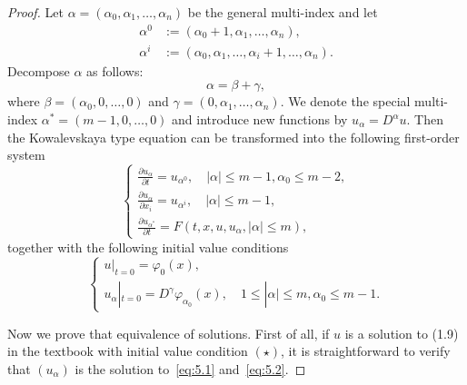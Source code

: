 \begin{proof}
  Let $\alpha = (\alpha_0,\alpha_1,\ldots,\alpha_n)$ be the general multi-index
  and let 
  \begin{align*}
    \alpha^0 & := (\alpha_0+1,\alpha_1,\ldots,\alpha_n), \\
    \alpha^i & := (\alpha_0,\alpha_1,\ldots,\alpha_i+1,\ldots,\alpha_n).
  \end{align*}
  Decompose $\alpha$ as follows:
  \[ \alpha = \beta + \gamma, \]
  where $\beta=(\alpha_0,0,\ldots,0)$ and $\gamma=(0,\alpha_1,\ldots,\alpha_n)$.
  We denote the special multi-index $\alpha^* = (m-1,0,\ldots,0)$
  and introduce new functions by $u_\alpha = D^\alpha u$.
  Then the Kowalevskaya type equation can be transformed into
  the following first-order system
  \begin{equation}\label{eq:5.1}
    \begin{cases}
      \frac{\partial u_\alpha}{\partial t} = u_{\alpha^0}, \quad |\alpha|\leq m-1, \alpha_0\leq m-2, \\
      \frac{\partial u_\alpha}{\partial x_i} = u_{\alpha^i}, \quad |\alpha|\leq m-1, \\
      \frac{\partial u_{\alpha^*}}{\partial t} = F(t,x,u,u_\alpha,|\alpha|\leq m),
    \end{cases}
  \end{equation}
  together with the following initial value conditions
  \begin{equation}\label{eq:5.2}
    \begin{cases}
      u|_{t=0} = \varphi_0(x), \\
      u_\alpha|_{t=0} = D^\gamma \varphi_{\alpha_0}(x),\quad 1\leq |\alpha|\leq m, \alpha_0\leq m-1. 
    \end{cases}
  \end{equation}

  Now we prove that equivalence of solutions. First of all,
  if $u$ is a solution to (1.9) in the textbook with initial value condition $(\star)$,
  it is straightforward to verify that $(u_\alpha)$ is the solution to~\eqref{eq:5.1} 
  and~\eqref{eq:5.2}.


\end{proof}
